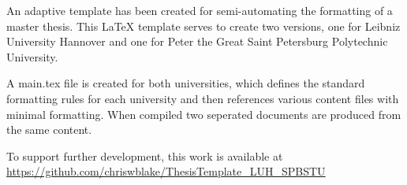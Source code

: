 \label{chap:conclusions}
An adaptive template has been created for semi-automating the formatting of a master thesis. This LaTeX template serves to create two versions, one for Leibniz University Hannover and one for Peter the Great Saint Petersburg Polytechnic University.

A main.tex file is created for both universities, which defines the standard formatting rules for each university and then references various content files with minimal formatting. When compiled two seperated documents are produced from the same content.

To support further development, this work is available at \url{ https://github.com/chriswblake/ThesisTemplate_LUH_SPBSTU}